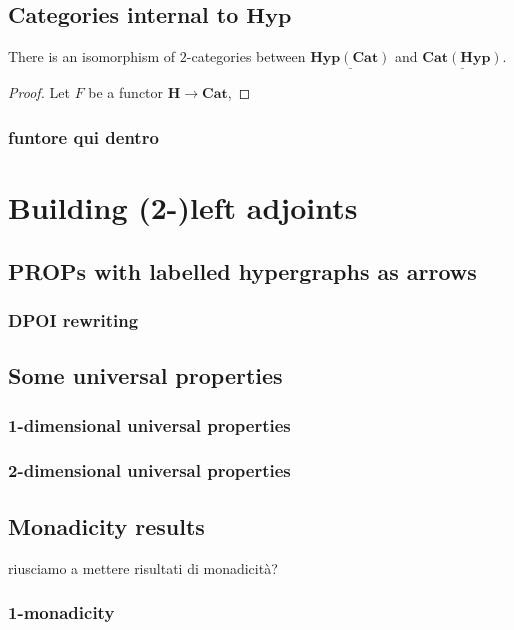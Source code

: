 \documentclass[a4paper,UKenglish,cleveref,pdftex,thm-restate,numberwithinsect]{lipics-v2021}
\newcommand{\cat}[1]{\ensuremath{\mathbf{#1}}}
\newcommand{\categ}{\mathbf{Cat}}
\newcommand{\dcate}[1]{\underline{\mathbf{Cat}(\cat{#1})}}
\newcommand{\dhyp}[1]{\underline{\mathbf{Hyp}(\cat{#1})}}
\newcommand{\hyp}{\cat{Hyp}}
\begin{document}
\subsection{Categories internal to $\hyp$}


\begin{theorem}There is an isomorphism of $2$-categories between $\dhyp{\categ}$ and $\dcate{\hyp}$.
\end{theorem}
\begin{proof}
Let $F$ be a functor $\cat{H}\to \categ$, 	
\end{proof}

\subsubsection{funtore qui dentro}

\section{Building (2-)left adjoints}

\subsection{PROPs with labelled hypergraphs as arrows}

\subsubsection{DPOI rewriting}
\subsection{Some universal properties}

\subsubsection{1-dimensional universal properties}

\subsubsection{2-dimensional universal properties}

\subsection{Monadicity results}
riusciamo a mettere risultati di monadicità?

\subsubsection{1-monadicity}
\end{document}
